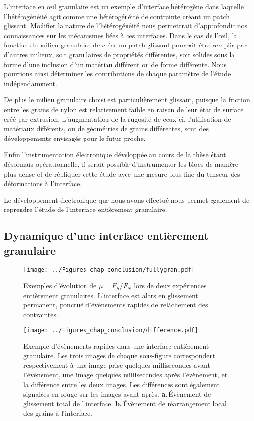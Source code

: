 L'interface en œil granulaire est un exemple d'interface hétérogène dans laquelle l'hétérogénéité agit comme une hétérogénéité de contrainte créant un patch glissant. Modifier la nature de l'hétérogénéité nous permettrait d'approfondir nos connaissances sur les mécanismes liées à ces interfaces. Dans le cas de l'œil, la fonction du milieu granulaire de créer un patch glissant pourrait être remplie par d'autres milieux, soit granulaires de propriétés différentes, soit solides sous la forme d'une inclusion d'un matériau différent ou de forme différente. Nous pourrions ainsi déterminer les contributions de chaque paramètre de l'étude indépendamment.

De plus le milieu granulaire choisi est particulièrement glissant, puisque la friction entre les grains de nylon est relativement faible en raison de leur état de surface créé par extrusion. L'augmentation de la rugosité de ceux-ci, l'utilisation de matériaux différents, ou de géométries de grains différentes, sont des développements envisagés pour le futur proche.

Enfin l'instrumentation électronique développée au cours de la thèse étant désormais opérationnelle, il serait possible d'instrumenter les blocs de manière plus dense et de répliquer cette étude avec une mesure plus fine du tenseur des déformations à l'interface.

Le développement électronique que nous avons effectué nous permet également de reprendre l'étude de l'interface entièrement granulaire.

\subsection{Dynamique d'une interface entièrement granulaire}
\label{sec:fullygranpersp}

\begin{figure}[phtb]
\centering
\texttt{[image: ../Figures\_chap\_conclusion/fullygran.pdf]}
\caption[Dynamique locale d'une interface entièrement granulaire]{Exemples d'évolution de $\mu=F_S/F_N$ lors de deux expériences entièrement granulaires. L'interface est alors en glissement permanent, ponctué d'évènements rapides de relâchement des contraintes.}
\label{fig:dyngran}
\end{figure}

\begin{figure}[phtb]
\centering
\texttt{[image: ../Figures\_chap\_conclusion/difference.pdf]}
\caption[Dynamique locale d'une interface entièrement granulaire]{Exemple d'évènements rapides dans une interface entièrement granulaire. Les trois images de chaque sous-figure correspondent respectivement à une image prise quelques millisecondes avant l'évènement, une image quelques millisecondes après l'évènement, et la différence entre les deux images. Les différences sont également signalées en rouge sur les images avant-après. \textbf{a.}\,Évènement de glissement total de l'interface. \textbf{b.}\,Évènement de réarrangement local des grains à l'interface.}
\label{fig:dyngranlocal}
\end{figure}


